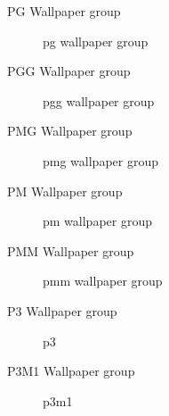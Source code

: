 \begin{frame}{PG Wallpaper group}
    \begin{figure}
        \centering
        
        \caption{pg wallpaper group}
        \label{fig:pg}
    \end{figure}
\end{frame}

\begin{frame}{PGG Wallpaper group}
    \begin{figure}
        \centering
        
        \caption{pgg wallpaper group}
        \label{fig:pgg}
    \end{figure}
\end{frame}

\begin{frame}{PMG Wallpaper group}
    \begin{figure}
        \centering
        
        \caption{pmg wallpaper group}
        \label{fig:pmg}
    \end{figure}
\end{frame}

\begin{frame}{PM Wallpaper group}
    \begin{figure}
        \centering
        
        \caption{pm wallpaper group}
        \label{fig:pmm}
    \end{figure}
\end{frame}

\begin{frame}{PMM Wallpaper group}
    \begin{figure}
        \centering
        
        \caption{pmm wallpaper group}
        \label{fig:pmm}
    \end{figure}
\end{frame}

\begin{frame}{P3 Wallpaper group}
    \begin{figure}
        \centering
        
        \caption{p3}
        \label{fig:p3}
    \end{figure}
\end{frame}

\begin{frame}{P3M1 Wallpaper group}
    \begin{figure}
        \centering
        
        \caption{p3m1}
        \label{fig:p3m1}
    \end{figure}
\end{frame}

